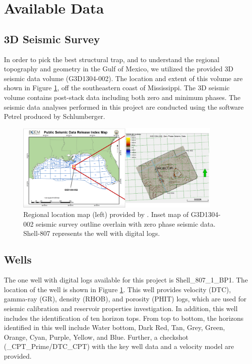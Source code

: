 \documentclass[fleqn]{article}
\begin{document}
\section{Available Data}
\subsection{3D Seismic Survey}
In order to pick the best structural trap, and to understand the regional topography and geometry in the Gulf of Mexico, we utilized the provided 3D seismic data volume (G3D1304-002). The location and extent of this volume are shown in Figure \ref{fig:LocationMap}, off the southeastern coast of Mississippi. The 3D seismic volume contains post-stack data including both zero and minimum phases. The seismic data analyses performed in this project are conducted using the software Petrel produced by Schlumberger.

\begin{figure}[H]
    \centering
    \includegraphics[width=4in]{Images/locationmap.png}
    \caption{Regional location map (left) provided by \citeauthor{BOEM}. Inset map of G3D1304-002 seismic survey outline overlain with zero phase seismic data. Shell-807 represents the well with digital logs.}
    \label{fig:LocationMap}
\end{figure}

\subsection{Wells}

The one well with digital logs available for this project is Shell\_807\_1\_BP1. The location of the well is shown in Figure \ref{fig:LocationMap}. This well provides velocity (DTC), gamma-ray (GR), density (RHOB), and porosity (PHIT) logs, which are used for seismic calibration and reservoir properties investigation. In addition, this well includes the identification of ten horizon tops. From top to bottom, the horizons identified in this well include Water bottom, Dark Red, Tan, Grey, Green, Orange, Cyan, Purple, Yellow, and Blue. Further, a checkshot (\_CPT\_Prime/DTC\_CPT) with the key well data and a velocity model are provided.
\end{document}
